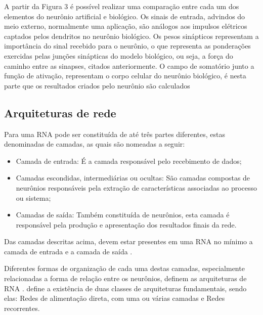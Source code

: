

A partir da Figura 3 é possível realizar uma comparação entre cada um dos elementos do neurônio artificial e biológico. Os sinais de entrada, advindos do meio externo, normalmente uma aplicação, são análogos aos impulsos elétricos captados pelos dendritos no neurônio biológico.  Os pesos sinápticos representam a importância do sinal recebido para o neurônio, o que representa as ponderações exercidas pelas junções sinápticas do modelo biológico, ou seja, a força do caminho entre as sinapses, citados anteriormente. O campo de somatório junto a função de ativação, representam o corpo celular do neurônio biológico, é nesta parte que os resultados criados pelo neurônio são calculados \cite{livroNunes2016} 

\subsection{Arquiteturas de rede} 

Para  uma RNA pode ser constituída de até três partes diferentes, estas denominadas de camadas, as quais são nomeadas a seguir:

\begin{itemize}
    \item Camada de entrada: É a camada responsável pelo recebimento de dados;
    \item Camadas escondidas, intermediárias ou ocultas: São camadas compostas de neurônios responsáveis pela extração de características associadas ao processo ou sistema;
    \item Camadas de saída: Também constituída de neurônios, esta camada é responsável pela produção e apresentação dos resultados finais da rede.
\end{itemize}

Das camadas descritas acima, devem estar presentes em uma RNA no mínimo a camada de entrada e a camada de saída \cite{Cintra2019}.

Diferentes formas de organização de cada uma destas camadas, especialmente relacionadas a forma de relação entre os neurônios, definem as arquiteturas de RNA \cite{livroNunes2016}.  define a existência de duas classes de arquiteturas fundamentais, sendo elas: Redes de alimentação direta, com uma ou várias camadas e Redes recorrentes.

